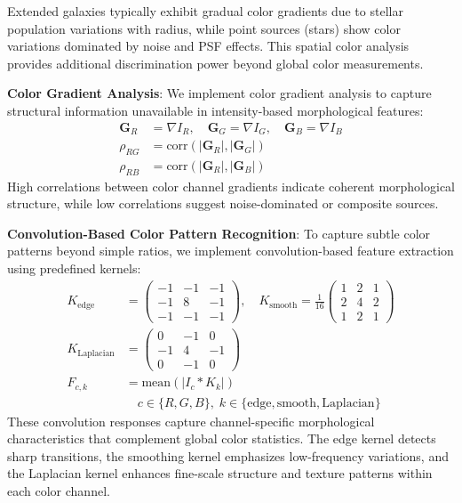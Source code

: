 \documentclass[twocolumn,10pt]{aastex631}
\begin{document}
Extended galaxies typically exhibit gradual color gradients due to stellar population variations with radius, while point sources (stars) show color variations dominated by noise and PSF effects. This spatial color analysis provides additional discrimination power beyond global color measurements.

\textbf{Color Gradient Analysis}: We implement color gradient analysis to capture structural information unavailable in intensity-based morphological features:
\begin{align}
\mathbf{G}_R &= \nabla I_R, \quad \mathbf{G}_G = \nabla I_G, \quad \mathbf{G}_B = \nabla I_B \\
\rho_{RG} &= \text{corr}(|\mathbf{G}_R|, |\mathbf{G}_G|) \\
\rho_{RB} &= \text{corr}(|\mathbf{G}_R|, |\mathbf{G}_B|)
\end{align}
High correlations between color channel gradients indicate coherent morphological structure, while low correlations suggest noise-dominated or composite sources.

\textbf{Convolution-Based Color Pattern Recognition}: To capture subtle color patterns beyond simple ratios, we implement convolution-based feature extraction using predefined kernels:
\begin{align}
K_{\text{edge}} &= \begin{pmatrix} -1 & -1 & -1 \\ -1 & 8 & -1 \\ -1 & -1 & -1 \end{pmatrix}, \quad 
K_{\text{smooth}} = \frac{1}{16}\begin{pmatrix} 1 & 2 & 1 \\ 2 & 4 & 2 \\ 1 & 2 & 1 \end{pmatrix} \\
K_{\text{Laplacian}} &= \begin{pmatrix} 0 & -1 & 0 \\ -1 & 4 & -1 \\ 0 & -1 & 0 \end{pmatrix} \\
F_{c,k} &= \text{mean}(|I_c * K_k|) \nonumber \\
&\quad c \in \{R,G,B\}, \; k \in \{\text{edge}, \text{smooth}, \text{Laplacian}\}
\end{align}
These convolution responses capture channel-specific morphological characteristics that complement global color statistics. The edge kernel detects sharp transitions, the smoothing kernel emphasizes low-frequency variations, and the Laplacian kernel enhances fine-scale structure and texture patterns within each color channel.
\end{document}

